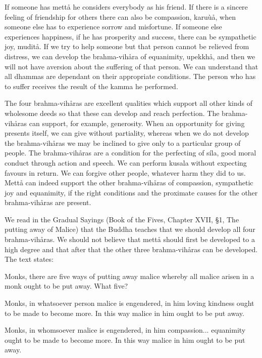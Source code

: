 \documentclass[12pt,twoside]{article}
\begin{document}
If someone has mett{\aa} he considers everybody as his friend. If there
is a sincere feeling of friendship for others there can also be
compassion, karu\`u{\aa}, when someone else has to experience sorrow
and misfortune. If someone else experiences happiness, if he has
prosperity and success, there can be sympathetic joy, mudit{\aa}. If we
try to help someone but that person cannot be relieved from distress,
we can develop the brahma{}-vih{\aa}ra of equanimity, upekkh{\aa}, and
then we will not have aversion about the suffering of that person. We
can understand that all dhammas are dependant on their appropriate
conditions. The person who has to suffer receives the result of the
kamma he performed. 

The four brahma{}-vih{\aa}ras are excellent qualities which support all
other kinds of wholesome deeds so that these can develop and reach
perfection. The brahma{}-vih{\aa}ras can support, for example,
generosity. When an opportunity for giving presents itself, we can give
without partiality, whereas when we do not develop the
brahma{}-vih{\aa}ras we may be inclined to give only to a particular
group of people. The brahma{}-vih{\aa}ras are a condition for the
perfecting of s\'ila, good moral conduct through action and speech. We
can perform kusala without expecting favours in return. We can forgive
other people, whatever harm they did to us. Mett{\aa} can indeed
support the other brahma{}-vih{\aa}ras of compassion, sympathetic joy
and equanimity, if the right conditions and the proximate causes for
the other brahma{}-vih{\aa}ras are present. 

We read in the Gradual Sayings (Book of the Fives, Chapter XVII, {\S}1,
The putting away of Malice) that the Buddha teaches that we should
develop all four brahma{}-vih{\aa}ras. We should not believe that
mett{\aa} should first be developed to a high degree and that after
that the other three brahma{}-vih{\aa}ras can be developed. The text
states:


\bigskip

Monks, there are five ways of putting away malice whereby all malice
arisen in a monk ought to be put away. What five? 

Monks, in whatsoever person malice is engendered, in him loving kindness
ought to be made to become more. In this way malice in him ought to be
put away. 

Monks, in whomsoever malice is engendered, in him compassion...
equanimity ought to be made to become more. In this way malice in him
ought to be put away. 
\end{document}
